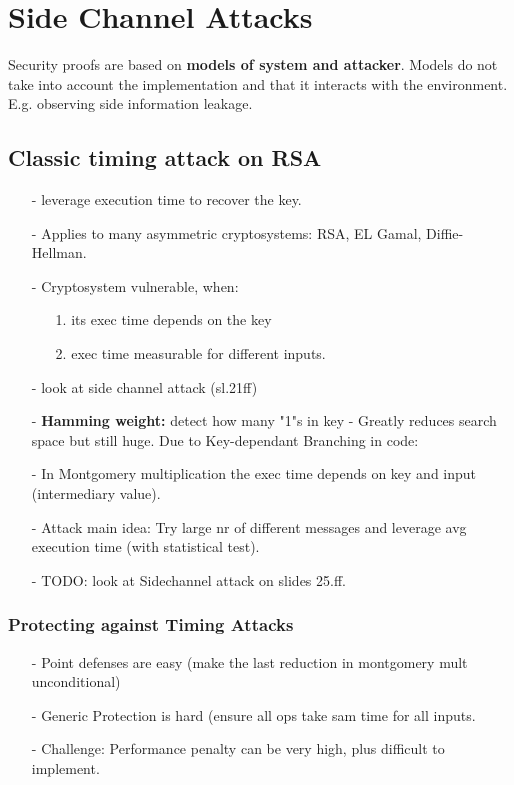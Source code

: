 \section{Side Channel Attacks}

Security proofs are based on \textbf{models of system and attacker}. Models do not take into account the implementation and that it interacts with the environment. E.g. observing side information leakage.\\

\subsection{Classic timing attack on RSA}
    \begin{itemize}
        \item [-]leverage execution time to recover the key.
        \item [-]Applies to many asymmetric cryptosystems: RSA, EL Gamal, Diffie-Hellman.
        \item [-]Cryptosystem vulnerable, when: 
        \begin{itemize}
            \item[1.] its exec time depends on the key
            \item[2.] exec time measurable for different inputs.
        \end{itemize}
        \item [-]look at side channel attack (sl.21ff)
        \item [-]\textbf{Hamming weight:} detect how many "1"s in key - Greatly reduces search space             but still huge. Due to Key-dependant Branching in code:
        \item [-]In Montgomery multiplication the exec time depends on key and input (intermediary           value).
        \item [-] Attack main idea: Try large nr of different messages and leverage avg execution            time (with statistical test).
        \item [-] TODO: look at Sidechannel attack on slides 25.ff.
    \end{itemize}    

\subsubsection{Protecting against Timing Attacks}
\begin{itemize}
    \item[-] Point defenses are easy (make the last reduction in montgomery mult unconditional)
    \item[-] Generic Protection is hard (ensure all ops take sam time for all inputs.
    \item[-] Challenge: Performance penalty can be very high, plus difficult to implement.
\end{itemize}


